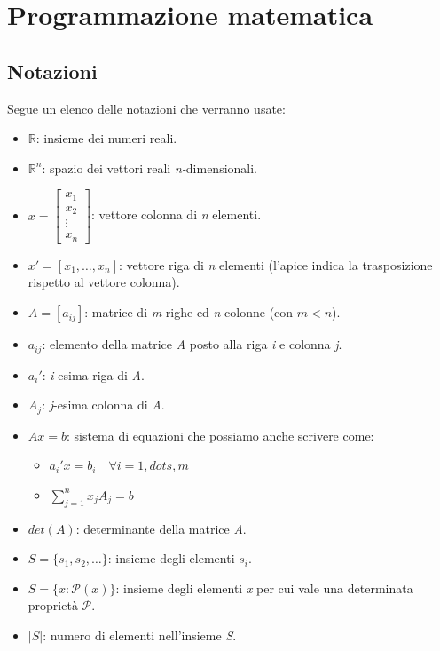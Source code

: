 \documentclass[11pt, oneside]{book}
\begin{document}

\chapter{Programmazione matematica}

\section{Notazioni}

Segue un elenco delle notazioni che verranno usate:

\begin{itemize}
\item $\mathbb{R}$: insieme dei numeri reali.
\item $\mathbb{R}^n$: spazio dei vettori reali {\em n-}dimensionali.
\item $x = \begin{bmatrix} x_1 \\ x_2 \\ \vdots \\ x_n \end{bmatrix}$:
  vettore colonna di {\em n} elementi.
\item $x' = [x_1,\dots,x_n]$: vettore riga di {\em n} elementi
  (l'apice indica la trasposizione rispetto al vettore colonna).
\item $A = [a_{ij}]$: matrice di {\em m} righe ed {\em n} colonne (con
  $m<n$).
\item $a_{ij}$: elemento della matrice {\em A} posto alla riga {\em i}
  e colonna {\em j}.
\item $a_i'$: {\em i}-esima riga di {\em A}.
\item $A_j$: {\em j}-esima colonna di {\em A}.
\item $Ax=b$: sistema di equazioni che possiamo anche scrivere come:

  \begin{itemize}
  \item $a_i'x = b_i \quad \forall i=1,dots,m$
  \item $\sum\limits_{j=1}^{n} x_jA_j = b$
  \end{itemize}

\item $det(A)$: determinante della matrice {\em A}.
\item $S = \{ s_1, s_2, \dots\}$: insieme degli elementi $s_i$.
\item $S = \{x : \mathcal{P}(x)\}$: insieme degli elementi {\em x} per
  cui vale una determinata propriet\`a $\mathcal{P}$.
\item $|S|$: numero di elementi nell'insieme {\em S}.
\end{itemize}
\end{document}
